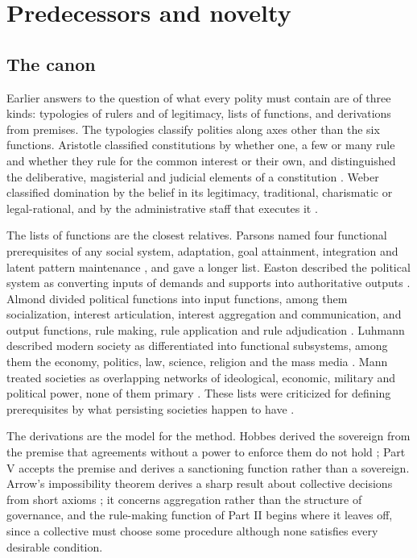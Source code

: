 \documentclass[11pt,letterpaper]{article}
\theoremstyle{definition}
\theoremstyle{remark}
\begin{document}
\section{Predecessors and novelty}
\label{sec:literature}

\subsection{The canon}

Earlier answers to the question of what every polity must contain are of three kinds: typologies of rulers and of legitimacy, lists of functions, and derivations from premises. The typologies classify polities along axes other than the six functions. Aristotle classified constitutions by whether one, a few or many rule and whether they rule for the common interest or their own, and distinguished the deliberative, magisterial and judicial elements of a constitution \citep{aristotle1996}. Weber classified domination by the belief in its legitimacy, traditional, charismatic or legal-rational, and by the administrative staff that executes it \citep{weber1978}.

The lists of functions are the closest relatives. Parsons named four functional prerequisites of any social system, adaptation, goal attainment, integration and latent pattern maintenance \citep{parsons1951}, and \citet{aberle1950} gave a longer list. Easton described the political system as converting inputs of demands and supports into authoritative outputs \citep{easton1965}. Almond divided political functions into input functions, among them socialization, interest articulation, interest aggregation and communication, and output functions, rule making, rule application and rule adjudication \citep{almond1960}. Luhmann described modern society as differentiated into functional subsystems, among them the economy, politics, law, science, religion and the mass media \citep{luhmann1995}. Mann treated societies as overlapping networks of ideological, economic, military and political power, none of them primary \citep{mann1986,mann1993}. These lists were criticized for defining prerequisites by what persisting societies happen to have \citep{hempel1959,elster1983}.

The derivations are the model for the method. Hobbes derived the sovereign from the premise that agreements without a power to enforce them do not hold \citep{hobbes1651}; Part V accepts the premise and derives a sanctioning function rather than a sovereign. Arrow's impossibility theorem derives a sharp result about collective decisions from short axioms \citep{arrow1951}; it concerns aggregation rather than the structure of governance, and the rule-making function of Part II begins where it leaves off, since a collective must choose some procedure although none satisfies every desirable condition.
\end{document}
